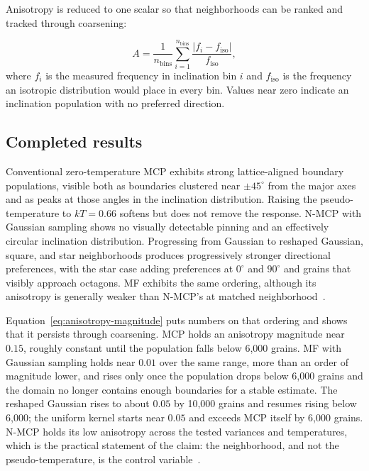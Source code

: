 \documentclass[proposalMode]{ufdissertation}
\begin{document}
Anisotropy is reduced to one scalar so that neighborhoods can be ranked and tracked through coarsening:

\begin{equation}
A
=
\frac{1}{n_{\mathrm{bins}}}
\sum_{i=1}^{n_{\mathrm{bins}}}
\frac{\left|f_i-f_{\mathrm{iso}}\right|}{f_{\mathrm{iso}}},
\label{eq:anisotropy-magnitude}
\end{equation}
where \(f_i\) is the measured frequency in inclination bin \(i\) and \(f_{\mathrm{iso}}\) is the frequency an isotropic distribution would place in every bin. Values near zero indicate an inclination population with no preferred direction.

\subsection{Completed results}

Conventional zero-temperature MCP exhibits strong lattice-aligned boundary populations, visible both as boundaries clustered near \(\pm45^\circ\) from the major axes and as peaks at those angles in the inclination distribution. Raising the pseudo-temperature to \(kT=0.66\) softens but does not remove the response. N-MCP with Gaussian sampling shows no visually detectable pinning and an effectively circular inclination distribution. Progressing from Gaussian to reshaped Gaussian, square, and star neighborhoods produces progressively stronger directional preferences, with the star case adding preferences at \(0^\circ\) and \(90^\circ\) and grains that visibly approach octagons. MF exhibits the same ordering, although its anisotropy is generally weaker than N-MCP's at matched neighborhood~\cite{tian2026neighborhood}.

Equation~\eqref{eq:anisotropy-magnitude} puts numbers on that ordering and shows that it persists through coarsening. MCP holds an anisotropy magnitude near \(0.15\), roughly constant until the population falls below 6,000 grains. MF with Gaussian sampling holds near \(0.01\) over the same range, more than an order of magnitude lower, and rises only once the population drops below 6,000 grains and the domain no longer contains enough boundaries for a stable estimate. The reshaped Gaussian rises to about \(0.05\) by 10,000 grains and resumes rising below 6,000; the uniform kernel starts near \(0.05\) and exceeds MCP itself by 6,000 grains. N-MCP holds its low anisotropy across the tested variances and temperatures, which is the practical statement of the claim: the neighborhood, and not the pseudo-temperature, is the control variable~\cite{tian2026neighborhood}.
\end{document}
